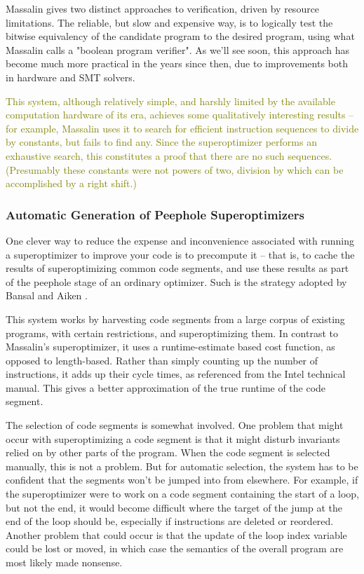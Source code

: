 \documentclass[12pt,twoside]{reedthesis}
\newcommand{\green}[1]{\textcolor{olive}{#1}}
\begin{document}
            Massalin gives two distinct approaches to verification, driven by resource limitations.
            The reliable, but slow and expensive way, is to logically test the bitwise equivalency of the candidate program to the desired program, using what Massalin calls a "boolean program verifier".
            As we'll see soon, this approach has become much more practical in the years since then, due to improvements both in hardware and SMT solvers. 
                
            \green{
            This system, although relatively simple, and harshly limited by the available computation hardware of its era, achieves some qualitatively interesting results -- for example, Massalin uses it to search for efficient instruction sequences to divide by constants, but fails to find any.
            Since the superoptimizer performs an exhaustive search, this constitutes a proof that there are no such sequences. (Presumably these constants were not powers of two, division by which can be accomplished by a right shift.)
            }

        \subsubsection{Automatic Generation of Peephole Superoptimizers}
            One clever way to reduce the expense and inconvenience associated with running a superoptimizer to improve your code is to precompute it
            -- that is, to cache the results of superoptimizing common code segments, and use these results as part of the peephole stage of an ordinary optimizer.
            Such is the strategy adopted by Bansal and Aiken \cite{bansal2006peephole}.
            
            This system works by harvesting code segments from a large corpus of existing programs, with certain restrictions, and superoptimizing them. 
            In contrast to Massalin's superoptimizer, it uses a runtime-estimate based cost function, as opposed to length-based.
            Rather than simply counting up the number of instructions, it adds up their cycle times, as referenced from the Intel technical manual.
            This gives a better approximation of the true runtime of the code segment.
            
            The selection of code segments is somewhat involved.
            One problem that might occur with superoptimizing a code segment is that it might disturb invariants relied on by other parts of the program.
            When the code segment is selected manually, this is not a problem.
            But for automatic selection, the system has to be confident that the segments won't be jumped into from elsewhere.
            For example, if the superoptimizer were to work on a code segment containing the start of a loop, but not the end, it would become difficult where the target of the jump at the end of the loop should be, especially if instructions are deleted or reordered.
            Another problem that could occur is that the update of the loop index variable could be lost or moved, in which case the semantics of the overall program are most likely made nonsense.
            
\end{document}
